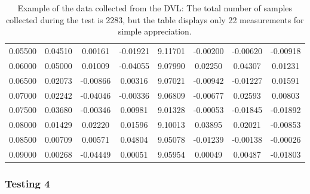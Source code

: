 \documentclass[]{article}
\begin{document}
\begin{table}[ht]
\begin{center}
\begin{tabular}{cccccccc}
			\footnotesize 0.05500 & \footnotesize 0.04510 & \footnotesize 0.00161 & \footnotesize -0.01921 & \footnotesize 9.11701 & \footnotesize -0.00200 & \footnotesize -0.00620 & \footnotesize -0.00918 \\
			\footnotesize 0.06000 & \footnotesize 0.05000 & \footnotesize 0.01009 & \footnotesize -0.04055 & \footnotesize 9.07990 & \footnotesize 0.02250 & \footnotesize 0.04307 & \footnotesize 0.01231 \\
			\footnotesize 0.06500 & \footnotesize 0.02073 & \footnotesize -0.00866 & \footnotesize 0.00316 & \footnotesize 9.07021 & \footnotesize -0.00942 & \footnotesize -0.01227 & \footnotesize 0.01591 \\
			\footnotesize 0.07000 & \footnotesize 0.02242 & \footnotesize -0.04046 & \footnotesize -0.00336 & \footnotesize 9.06809 & \footnotesize -0.00677 & \footnotesize 0.02593 & \footnotesize 0.00803 \\
			\footnotesize 0.07500 & \footnotesize 0.03680 & \footnotesize -0.00346 & \footnotesize 0.00981 & \footnotesize 9.01328 & \footnotesize -0.00053 & \footnotesize -0.01845 & \footnotesize -0.01892 \\
			\footnotesize 0.08000 & \footnotesize 0.01429 & \footnotesize 0.02220 & \footnotesize 0.01596 & \footnotesize 9.10013 & \footnotesize 0.03895 & \footnotesize 0.02021 & \footnotesize -0.00853 \\
			\footnotesize 0.08500 & \footnotesize 0.00709 & \footnotesize 0.00571 & \footnotesize 0.04804 & \footnotesize 9.05078 & \footnotesize -0.01239 & \footnotesize -0.00138 & \footnotesize -0.00026 \\
			\footnotesize 0.09000 & \footnotesize 0.00268 & \footnotesize -0.04449 & \footnotesize 0.00051 & \footnotesize 9.05954 & \footnotesize 0.00049 & \footnotesize 0.00487 & \footnotesize -0.01803 \\
			
			
			
			
			\bottomrule\end{tabular}
			\caption{Example of the data collected from the DVL: The total number of samples collected during the test is 2283, but the table displays only 22 measurements for simple appreciation.}
		\end{center}
	\end{table}
	
	\subsubsection{Testing 4}
	
\end{document}
